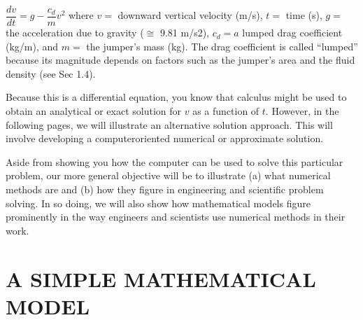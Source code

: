 \documentclass[../main.tex]{subfiles}
\begin{document}
$\dfrac{dv}{dt}=g-\dfrac{c_d}{m}v^2$
where $v =$ downward vertical velocity (m/s), $t =$ time (s), $g =$ the acceleration due to
gravity ($\cong$ 9.81 m/s2), $c_d = a$ lumped drag coefficient (kg/m), and $m =$ the jumper’s
mass (kg). The drag coefficient is called “lumped” because its magnitude depends on factors such as the jumper’s area and the fluid density (see Sec 1.4).


Because this is a differential equation, you know that calculus might be used to obtain
an analytical or exact solution for $v$ as a function of $t$. However, in the following pages, we
will illustrate an alternative solution approach. This will involve developing a computeroriented numerical or approximate solution.


Aside from showing you how the computer can be used to solve this particular problem, our more general objective will be to illustrate (a) what numerical methods are and
(b) how they figure in engineering and scientific problem solving. In so doing, we will also
show how mathematical models figure prominently in the way engineers and scientists use
numerical methods in their work.

\section{A SIMPLE MATHEMATICAL MODEL}
\label{sec:sec_1_1}
\end{document}
